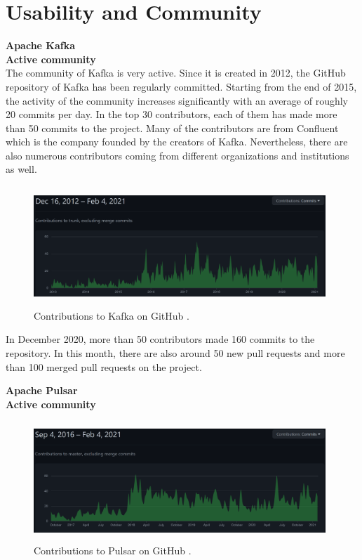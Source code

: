 \section{Usability and Community} \label{section:usability}
\large \textbf{Apache Kafka}\\
\normalsize
\textbf{Active community}\\
The community of Kafka is very active. Since it is created in 2012, the GitHub repository of Kafka has been regularly committed. Starting from the end of 2015, the activity of the community increases significantly with an average of roughly 20 commits per day. In the top 30 contributors, each of them has made more than 50 commits to the project. Many of the contributors are from Confluent which is the company founded by the creators of Kafka. Nevertheless, there are also numerous contributors coming from different organizations and institutions as well.

\begin{figure}[h]
	\centering
	\includegraphics[width=11cm,height=4.5cm]{images/community-kafka.png}
	\caption{Contributions to Kafka on GitHub \cite{kafkarepo}.}
	\label{fig:communitykafka}
\end{figure}

In December 2020, more than 50 contributors made 160 commits to the repository. In this month, there are also around 50 new pull requests and more than 100 merged pull requests on the project.

\large \textbf{Apache Pulsar}\\
\normalsize
\textbf{Active community}\\
\begin{figure}[h]
	\centering
	\includegraphics[width=11cm,height=4.5cm]{images/community-pulsar.png}
	\caption{Contributions to Pulsar on GitHub \cite{pulsarrepo}.}
	\label{fig:communitypulsar}
\end{figure}

